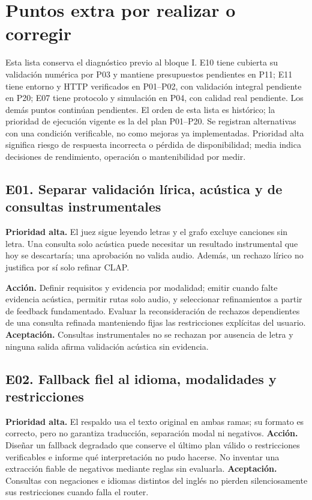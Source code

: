 \section{Puntos extra por realizar o corregir}
\label{sec:extras}
Esta lista conserva el diagnóstico previo al bloque I. E10 tiene cubierta su validación numérica por P03 y mantiene presupuestos pendientes en P11; E11 tiene entorno y HTTP verificados en P01--P02, con validación integral pendiente en P20; E07 tiene protocolo y simulación en P04, con calidad real pendiente. Los demás puntos continúan pendientes. El orden de esta lista
es histórico; la prioridad de ejecución vigente es la del plan P01--P20.
Se registran alternativas
con una condición verificable, no como mejoras ya implementadas. Prioridad alta
significa riesgo de respuesta incorrecta o pérdida de disponibilidad; media
indica decisiones de rendimiento, operación o mantenibilidad por medir.

\subsection{E01. Separar validación lírica, acústica y de consultas instrumentales}
\textbf{Prioridad alta.} El juez sigue leyendo letras y el grafo excluye canciones
sin letra. Una consulta solo acústica puede necesitar un resultado instrumental
que hoy se descartaría; una aprobación no valida audio. Además, un rechazo
lírico no justifica por sí solo refinar CLAP.

\textbf{Acción.} Definir requisitos y evidencia por modalidad; emitir
 cuando falte evidencia acústica, permitir rutas solo audio,
y seleccionar refinamientos a partir de feedback fundamentado. Evaluar la
reconsideración de rechazos dependientes de una consulta refinada manteniendo
fijas las restricciones explícitas del usuario.
\textbf{Aceptación.} Consultas instrumentales no se rechazan por ausencia de
letra y ninguna salida afirma validación acústica sin evidencia.

\subsection{E02. Fallback fiel al idioma, modalidades y restricciones}
\textbf{Prioridad alta.} El respaldo usa el texto original en ambas ramas; su
formato es correcto, pero no garantiza traducción, separación modal ni negativos.
\textbf{Acción.} Diseñar un fallback degradado que conserve el último plan válido
o restricciones verificables e informe qué interpretación no pudo hacerse.
No inventar una extracción fiable de negativos mediante reglas sin evaluarla.
\textbf{Aceptación.} Consultas con negaciones e idiomas distintos del inglés no
pierden silenciosamente sus restricciones cuando falla el router.

